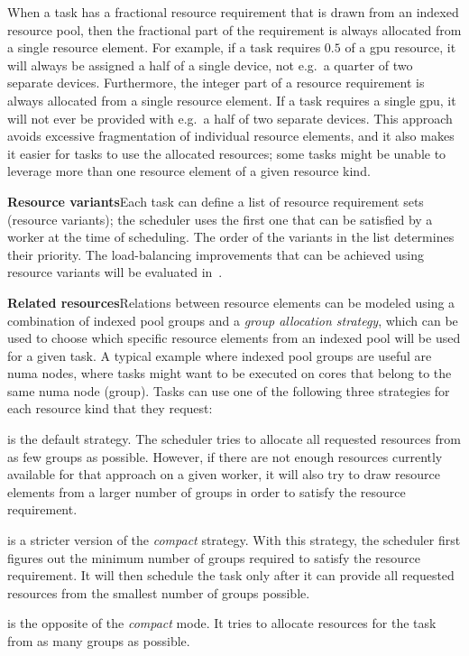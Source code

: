 When a task has a fractional resource requirement that is drawn from an indexed resource
pool, then the fractional part of the requirement is always allocated from a single resource
element. For example, if a task requires $0.5$ of a \gls{gpu} resource, it will always be
assigned a half of a single device, not e.g.\ a quarter of two separate devices. Furthermore,
the integer part of a resource requirement is always allocated from a single resource element.
If a task requires a single \gls{gpu}, it will not ever be provided with e.g.\ a half of two
separate devices. This approach avoids excessive fragmentation of individual resource elements, and
it also makes it easier for tasks to use the allocated resources; some tasks might be unable to
leverage more than one resource element of a given resource kind.

\vspace{2mm}\textbf{Resource variants}\enskip{}Each task can define a list of
resource requirement sets (resource variants); the scheduler uses the first one that can be
satisfied by a worker at the time of scheduling. The order of the variants in the list determines
their priority. The load-balancing improvements that can be achieved using resource variants will
be evaluated in~.

\vspace{2mm}\textbf{Related resources}\enskip{}Relations between resource
elements can be modeled using a combination of indexed pool groups and a \emph{group allocation strategy},
which can be used to choose which specific resource elements from an indexed pool will be used for
a given task. A typical example where indexed pool groups are useful are \gls{numa}
nodes, where tasks might want to be executed on cores that belong to the same
\gls{numa} node (group). Tasks can use one of the following three strategies for each resource kind
that they request:

\begin{description}[wide=0pt,itemsep=0pt,topsep=1pt]
	\item [Compact] is the default strategy. The scheduler tries to allocate all requested
	      resources from as few groups as possible. However, if there are not enough resources currently
	      available for that approach on a given worker, it will also try to draw resource elements from a
	      larger number of groups in order to satisfy the resource requirement.
	\item [Strict compact] is a stricter version of the \emph{compact} strategy. With this
	      strategy, the scheduler first figures out the minimum number of groups required to satisfy the
	      resource requirement. It will then schedule the task only after it can provide all requested
	      resources from the smallest number of groups possible.
	\item [Scatter] is the opposite of the \emph{compact} mode. It tries to allocate resources
	      for the task from as many groups as possible.
\end{description}


